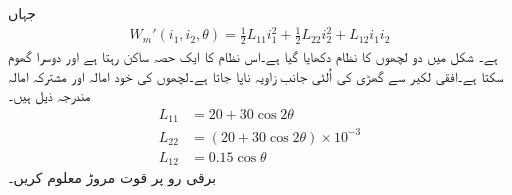 جہاں
\begin{align}\label{مساوات_تبادلہ_کوتوانائی_از_خود}
W_m'(i_1,i_2,\theta)=\frac{1}{2} L_{11} i_1^2+\frac{1}{2} L_{22} i_2^2+L_{12} i_1 i_2
\end{align}
ہے۔
%
شکل   میں دو لچھوں کا نظام دکھایا گیا ہے۔اس نظام کا ایک حصہ ساکن رہتا ہے اور دوسرا گھوم سکتا ہے۔افقی لکیر سے گھڑی کی اُلٹی جانب زاویہ   ناپا جاتا ہے۔لچھوں کی خود امالہ اور مشترکہ امالہ مندرجہ ذیل ہیں۔
\begin{align*}
L_{11}&=20+30\cos 2 \theta\\
L_{22}&=\left(20+30\cos 2\theta \right) \times 10^{-3}\\
L_{12}&=0.15 \cos \theta
\end{align*}
 برقی رو   پر قوت مروڑ  معلوم کریں۔
